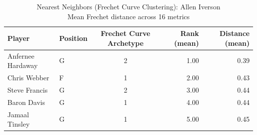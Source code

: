 \begin{table}[t]
\caption*{
{\fontsize{20}{25} Nearest Neighbors (Frechet Curve Clustering): Allen Iverson\fontsize{12}{15}\selectfont } \\ 
{\fontsize{14}{17}\selectfont  Mean Frechet distance across 16 metrics\fontsize{12}{15}\selectfont }
} 
\fontsize{12.0pt}{14.0pt}\selectfont
\begin{tabular*}{\linewidth}{@{\extracolsep{\fill}}llcrr}
\toprule
Player & Position & Frechet Curve Archetype & Rank (mean) & Distance (mean) \\ 
\midrule\addlinespace[2.5pt]
Anfernee Hardaway & G & 2 & 1.00 & 0.39 \\ 
Chris Webber & F & 1 & 2.00 & 0.43 \\ 
Steve Francis & G & 2 & 3.00 & 0.44 \\ 
Baron Davis & G & 1 & 4.00 & 0.44 \\ 
Jamaal Tinsley & G & 1 & 5.00 & 0.45 \\ 
\bottomrule
\end{tabular*}
\end{table}

